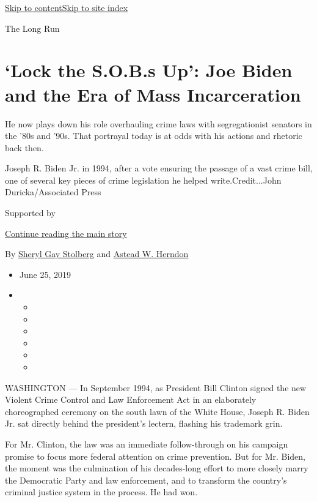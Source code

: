 \protect\hyperlink{site-content}{Skip to
content}\protect\hyperlink{site-index}{Skip to site index}

The Long Run

\hypertarget{lock-the-sobs-up-joe-biden-and-the-era-of-mass-incarceration}{%
\section{`Lock the S.O.B.s Up': Joe Biden and the Era of Mass
Incarceration}\label{lock-the-sobs-up-joe-biden-and-the-era-of-mass-incarceration}}

He now plays down his role overhauling crime laws with segregationist
senators in the '80s and '90s. That portrayal today is at odds with his
actions and rhetoric back then.

Joseph R. Biden Jr. in 1994, after a vote ensuring the passage of a vast
crime bill, one of several key pieces of crime legislation he helped
write.Credit...John Duricka/Associated Press

Supported by

\protect\hyperlink{after-sponsor}{Continue reading the main story}

By
\href{https://www.nytimes3xbfgragh.onion/by/sheryl-gay-stolberg}{Sheryl
Gay Stolberg} and
\href{https://www.nytimes3xbfgragh.onion/by/astead-w-herndon}{Astead W.
Herndon}

\begin{itemize}
\item
  June 25, 2019
\item
  \begin{itemize}
  \item
  \item
  \item
  \item
  \item
  \item
  \end{itemize}
\end{itemize}

WASHINGTON --- In September 1994, as President Bill Clinton signed the
new Violent Crime Control and Law Enforcement Act in an elaborately
choreographed ceremony on the south lawn of the White House, Joseph R.
Biden Jr. sat directly behind the president's lectern, flashing his
trademark grin.

For Mr. Clinton, the law was an immediate follow-through on his campaign
promise to focus more federal attention on crime prevention. But for Mr.
Biden, the moment was the culmination of his decades-long effort to more
closely marry the Democratic Party and law enforcement, and to transform
the country's criminal justice system in the process. He had won.

